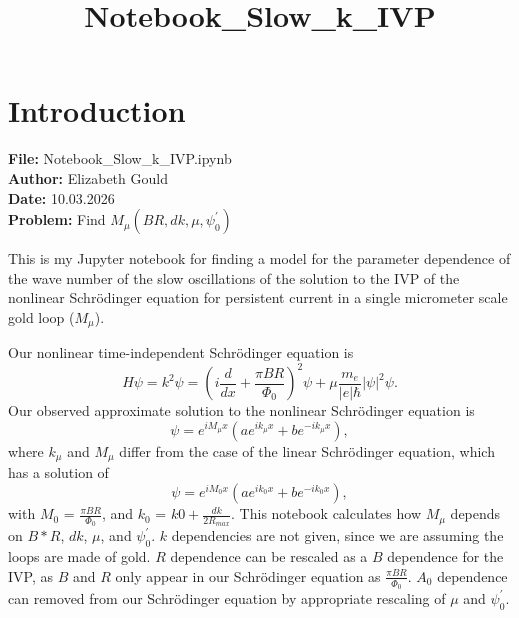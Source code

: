 \documentclass[11pt]{article}
\title{Notebook\_Slow\_k\_IVP}
\begin{document}
    
    \maketitle
    
    

    
    \hypertarget{introduction}{%
\section{Introduction}\label{introduction}}

    \textbf{File:} Notebook\_Slow\_k\_IVP.ipynb\\
\textbf{Author:} Elizabeth Gould\\
\textbf{Date:} 10.03.2026\\
\textbf{Problem:} Find
\(M_{\mu}\left(BR, dk, \mu, \psi_0^\prime\right)\)

    This is my Jupyter notebook for finding a model for the parameter
dependence of the wave number of the slow oscillations of the solution
to the IVP of the nonlinear Schrödinger equation for persistent current
in a single micrometer scale gold loop (\(M_{\mu}\)).

Our nonlinear time-independent Schrödinger equation is \begin{equation}
H \psi = k^2 \psi = \left( i \frac{d}{dx} + \frac{\pi BR}{\Phi_0} \right)^2 \psi + \mu \frac{m_e}{\left|e\right|\hbar} \left|\psi\right|^2 \psi.
\end{equation} Our observed approximate solution to the nonlinear
Schrödinger equation is \begin{equation}
\psi = e^{i M_{\mu} x} \left( a e^{i k_{\mu} x} + b e^{- i k_{\mu} x} \right),
\end{equation} where \(k_{\mu}\) and \(M_{\mu}\) differ from the case of
the linear Schrödinger equation, which has a solution of
\begin{equation}
\psi = e^{i M_0 x} \left( a e^{i k_0 x} + b e^{- i k_0 x} \right),
\end{equation} with \(M_{0}\) = \(\frac{\pi BR}{\Phi_0}\), and \(k_{0}\)
= \(k0 + \frac{dk}{2 R_{max} }\). This notebook calculates how
\(M_{\mu}\) depends on \(B * R\), \(dk\), \(\mu\), and
\(\psi^\prime_0\). \(k\) dependencies are not given, since we are
assuming the loops are made of gold. \(R\) dependence can be rescaled as
a \(B\) dependence for the IVP, as \(B\) and \(R\) only appear in our
Schrödinger equation as \(\frac{\pi BR}{\Phi_0}\). \(A_0\) dependence
can removed from our Schrödinger equation by appropriate rescaling of
\(\mu\) and \(\psi_0^\prime\).
\end{document}

